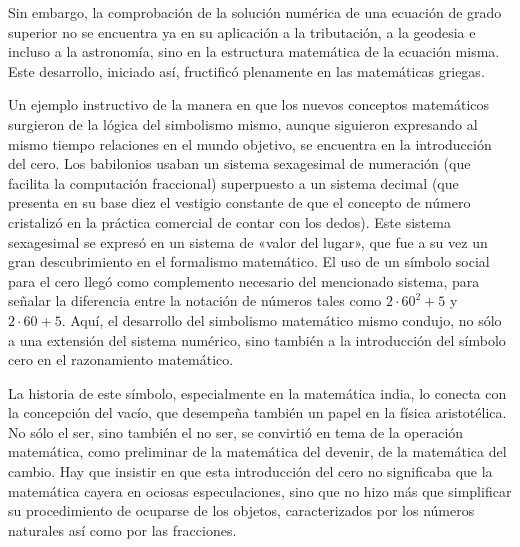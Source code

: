 \documentclass[a4paper, 12pt]{article}
\begin{document}
Sin embargo, la comprobación de la solución numérica de una ecuación de grado
superior no se encuentra ya en su aplicación a la tributación, a la geodesia e
incluso a la astronomía, sino en la estructura matemática de la ecuación misma.
Este desarrollo, iniciado así, fructificó plenamente en las matemáticas griegas.

Un ejemplo instructivo de la manera en que los nuevos conceptos matemáticos
surgieron de la lógica del simbolismo mismo, aunque siguieron expresando al
mismo tiempo relaciones en el mundo objetivo, se encuentra en la introducción
del cero. Los babilonios usaban un sistema sexagesimal de numeración (que
facilita la computación fraccional) superpuesto a un sistema decimal (que
presenta en su base diez el vestigio constante de que el concepto de número
cristalizó en la práctica comercial de contar con los dedos). Este sistema
sexagesimal se expresó en un sistema de «valor del lugar», que fue a su vez un
gran descubrimiento en el formalismo matemático. El uso de un símbolo social
para el cero llegó como complemento necesario del mencionado sistema, para
señalar la diferencia entre la notación de números tales como $2 \cdot 60^2 + 5$
y $2\cdot 60 + 5$. Aquí, el desarrollo del simbolismo matemático mismo condujo,
no sólo a una extensión del sistema numérico, sino también a la introducción del
símbolo cero en el razonamiento matemático.

La historia de este símbolo, especialmente en la matemática india, lo conecta
con la concepción del vacío, que desempeña también un papel en la física
aristotélica. No sólo el ser, sino también el no ser, se convirtió en tema de la
operación matemática, como preliminar de la matemática del devenir, de la
matemática del cambio. Hay que insistir en que esta introducción del cero no
significaba que la matemática cayera en ociosas especulaciones, sino que no hizo
más que simplificar su procedimiento de ocuparse de los objetos, caracterizados
por los números naturales así como por las fracciones.
\end{document}
